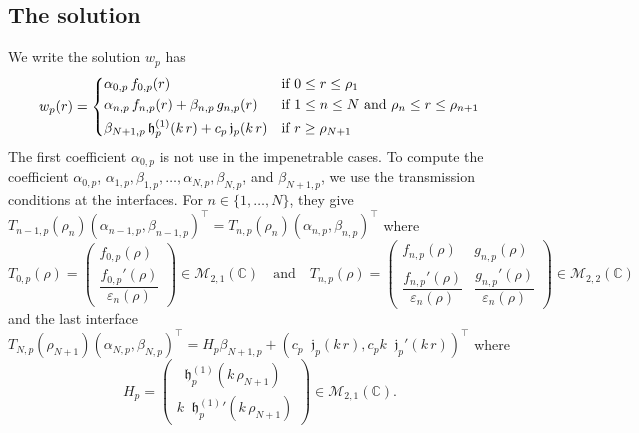 \documentclass[12pt,a4paper]{article}
\theoremstyle{definition}
\theoremstyle{plain}
\theoremstyle{remark}
\newcommand{\bbC}{\mathbb{C}}
\newcommand{\calM}{\mathcal{M}}
\newcommand{\frj}{\mathop{}\!\mathfrak{j}}
\newcommand{\frh}{\mathop{}\!\mathfrak{h}^{(1)}}
\newcommand{\eps}{\varepsilon}
\begin{document}
\subsection{The solution}

We write the solution \(w_p\) has
\begin{equation}
    w_p(r) = \begin{dcases}
        \alpha_{0, p}\, f_{0, p}(r)                              & \text{if } 0 \le r \le \rho_1                                     \\
        \alpha_{n, p}\, f_{n, p}(r) + \beta_{n, p}\, g_{n, p}(r) & \text{if } 1 \le n \le N \text{ and } \rho_n \le r \le \rho_{n+1} \\
        \beta_{N+1, p}\frh_p(k\, r)     + c_p\frj_p(k\, r)       & \text{if } r \ge \rho_{N+1}
    \end{dcases}
\end{equation}
The first coefficient \(\alpha_{0, p}\) is not use in the impenetrable cases.
To compute the coefficient \(\alpha_{0, p}\), \(\alpha_{1, p}, \beta_{1, p}, \ldots, \alpha_{N, p}, \beta_{N, p}\), and \(\beta_{N+1, p}\), we use the transmission conditions at the interfaces.
For \(n \in \{1, \ldots, N\}\), they give \(T_{n-1, p}(\rho_n)(\alpha_{n-1, p}, \beta_{n-1, p})^\intercal = T_{n, p}(\rho_n) (\alpha_{n, p}, \beta_{n, p})^\intercal\) where
\begin{equation}
    T_{0, p}(\rho) = \begin{pmatrix}
        f_{0, p}(\rho) \\[2ex]
        \dfrac{f_{0, p}'(\rho)}{\eps_n(\rho)}
    \end{pmatrix} \in \calM_{2, 1}(\bbC) \quad
    \text{and} \quad
    T_{n, p}(\rho) = \begin{pmatrix}
        f_{n, p}(\rho)                        & g_{n, p}(\rho)                        \\[2ex]
        \dfrac{f_{n, p}'(\rho)}{\eps_n(\rho)} & \dfrac{g_{n, p}'(\rho)}{\eps_n(\rho)}
    \end{pmatrix} \in \calM_{2, 2}(\bbC)
\end{equation}
and the last interface \(T_{N, p}(\rho_{N+1})(\alpha_{N, p}, \beta_{N, p})^\intercal = H_p \beta_{N+1, p} + (c_p\frj_p(k\, r), c_p k \frj_p'(k\, r))^\intercal\) where
\begin{equation}
    H_p = \begin{pmatrix}
        \frh_p(k\, \rho_{N+1}) \\[1ex]
        k{\frh_p}'(k\, \rho_{N+1})
    \end{pmatrix} \in \calM_{2, 1}(\bbC).
\end{equation}
\end{document}
